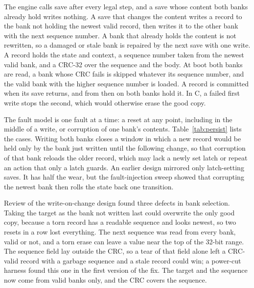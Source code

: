 \documentclass[preprint,12pt]{elsarticle}
\begin{document}
The engine calls save after every legal step, and a save whose content both banks already hold writes nothing. A save that changes the content writes a record to the bank not holding the newest valid record, then writes it to the other bank with the next sequence number. A bank that already holds the content is not rewritten, so a damaged or stale bank is repaired by the next save with one write. A record holds the state and context, a sequence number taken from the newest valid bank, and a CRC-32 over the sequence and the body. At boot both banks are read, a bank whose CRC fails is skipped whatever its sequence number, and the valid bank with the higher sequence number is loaded. A record is committed when its save returns, and from then on both banks hold it. In C, a failed first write stops the second, which would otherwise erase the good copy.

The fault model is one fault at a time: a reset at any point, including in the middle of a write, or corruption of one bank's contents. Table~\ref{tab:persist} lists the cases. Writing both banks closes a window in which a new record would be held only by the bank just written until the following change, so that corruption of that bank reloads the older record, which may lack a newly set latch or repeat an action that only a latch guards. An earlier design mirrored only latch-setting saves. It has half the wear, but the fault-injection sweep showed that corrupting the newest bank then rolls the state back one transition.

Review of the write-on-change design found three defects in bank selection. Taking the target as the bank not written last could overwrite the only good copy, because a torn record has a readable sequence and looks newest, so two resets in a row lost everything. The next sequence was read from every bank, valid or not, and a torn erase can leave a value near the top of the 32-bit range. The sequence field lay outside the CRC, so a tear of that field alone left a CRC-valid record with a garbage sequence and a stale record could win; a power-cut harness found this one in the first version of the fix. The target and the sequence now come from valid banks only, and the CRC covers the sequence.
\end{document}
